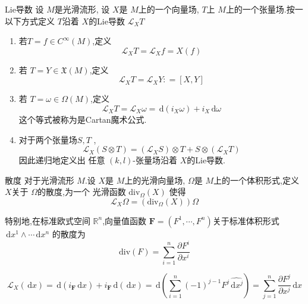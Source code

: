 \documentclass[../../main.tex]{subfiles}
\begin{document}
\begin{definition}{Lie导数}
    设 \(  M  \)是光滑流形, 设 \(  X  \)是 \(  M  \)上的一个向量场, \(  T  \)上 \(  M  \)上的一个张量场.按一以下方式定义 \(  T  \)沿着 \(  X  \)的Lie导数 \(  \mathcal{L}_{X}T  \)
    \begin{enumerate}
        \item 若\(  T= f\in C^{\infty}\left( M \right)   \),定义 \[
        \mathcal{L}_{X}T= \mathcal{L}_{X}f= X\left( f \right) 
        \]
        \item 若 \(  T=  Y \in \mathfrak{X}\left( M \right)   \),定义 \[
        \mathcal{L}_{X}T= \mathcal{L}_{X}Y: =  \left[ X,Y \right] 
        \]  
        \item 若 \(  T=  \omega \in  \Omega \left( M \right)   \),定义 \[
        \mathcal{L}_{X}T= \mathcal{L}_{X} \omega = \,\mathrm{d} \left( i_{X} \omega  \right) + i_{X}\,\mathrm{d}  \omega 
        \] 这个等式被称为是Cartan魔术公式.
        \item 对于两个张量场\(  S,T  \) ,  \[
        \mathcal{L}_{X}\left( S\otimes T \right)= \left( \mathcal{L}_{X}S \right)\otimes T+ S\otimes \left( \mathcal{L}_{X}T \right)   
        \]因此递归地定义出 任意  \(  \left( k,l \right)   \)-张量场沿着 \(  X  \)的Lie导数.  
    \end{enumerate}
           
\end{definition}

\begin{definition}{散度}
      对于光滑流形 \(  M  \).设 \(  X  \)是 \(  M  \)上的光滑向量场, \(   \Omega   \)是 \(  M  \)上的一个体积形式,定义 \(  X  \)关于 \(   \Omega   \)的散度,为一个     光滑函数 \(  \mathrm{div}_{ \Omega }\left( X \right)   \) 使得 \[
      \mathcal{L}_{X} \Omega = \left( \mathrm{div}_{ \Omega }\left( X \right)  \right) \Omega  
      \]

      特别地,在标准欧式空间 \(  \mathbb{R} ^{n}  \),向量值函数 \(  \mathbf{F}  = \left( F^{1},\cdots ,F^{n} \right) \)关于标准体积形式 \(  \,\mathrm{d} x^{1}\wedge \cdots \,\mathrm{d} x^{n}  \) 的散度为   \[
      \mathrm{div}\left( F \right)= \sum _{i= 1}^{n}\frac{\partial F^{i}}{\partial x^{i}} 
      \]
\end{definition}
\begin{remark}
    \[
    \mathcal{L}_{X}\left( \,\mathrm{d} x \right)= \,\mathrm{d} \left( i_{\mathbf{F}}\,\mathrm{d} x \right)+ i_{\mathbf{F}}\,\mathrm{d} \left( \,\mathrm{d} x \right)= \,\mathrm{d} \left( \sum _{i= 1}^{n}\left( -1 \right)^{j-1}F^{j} \hat{\,\mathrm{d} x^{j}}  \right)= \sum _{j= 1}^{n}\frac{\partial F^{j}}{\partial x^{j}}\,\mathrm{d} x  
    \]
\end{remark}
\end{document}
